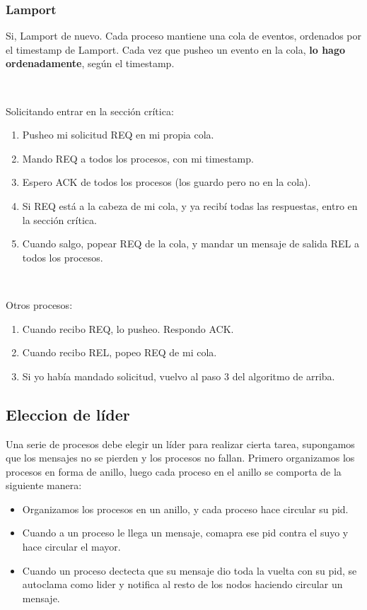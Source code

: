 \documentclass{article}
\begin{document}
\subsubsection{Lamport}
Si, Lamport de nuevo. Cada proceso mantiene una cola de eventos, ordenados por el timestamp de Lamport. Cada vez que pusheo un evento en la cola, \textbf{lo hago ordenadamente}, según el timestamp.

~

Solicitando entrar en la sección crítica:
\begin{enumerate}
 \item Pusheo mi solicitud REQ en mi propia cola.
 \item Mando REQ a todos los procesos, con mi timestamp.
 \item Espero ACK de todos los procesos (los guardo pero no en la cola).
 \item Si REQ está a la cabeza de mi cola, y ya recibí todas las respuestas, entro en la sección crítica.
 \item Cuando salgo, popear REQ de la cola, y mandar un mensaje de salida REL a todos los procesos.
\end{enumerate}

~

Otros procesos:
\begin{enumerate}
 \item Cuando recibo REQ, lo pusheo. Respondo ACK.
 \item Cuando recibo REL, popeo REQ de mi cola.
 \item Si yo había mandado solicitud, vuelvo al paso 3 del algoritmo de arriba.
\end{enumerate}

\subsection{Eleccion de líder}
Una serie de procesos debe elegir un líder para realizar cierta tarea, supongamos que los mensajes no se pierden y los procesos no fallan. Primero organizamos los procesos en forma de anillo, luego cada proceso en el anillo se comporta de la siguiente manera:

\begin{itemize}
 \item Organizamos los procesos en un anillo, y cada proceso hace circular su pid.
 \item Cuando a un proceso le llega un mensaje, comapra ese pid contra el suyo y hace circular el mayor.
 \item Cuando un proceso dectecta que su mensaje dio toda la vuelta con su pid, se autoclama como lider y notifica al resto de los nodos haciendo circular un mensaje.
\end{itemize}
\end{document}
